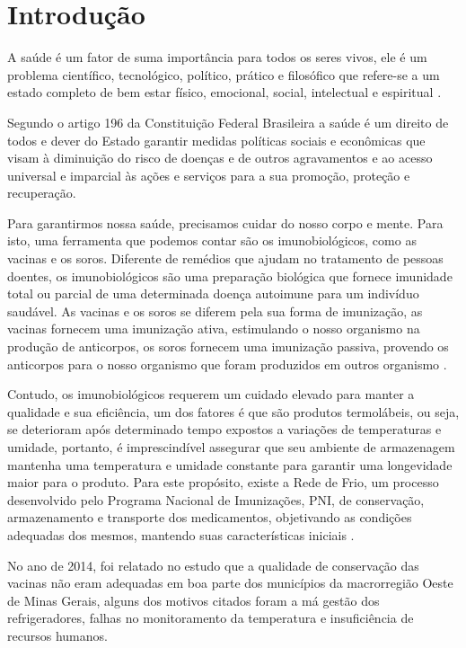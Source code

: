 \chapter[Introdução]{Introdução}
\label{cap:intro}
A saúde é um fator de suma importância para todos os seres vivos, ele é um problema científico, tecnológico, político, prático e filosófico que refere-se a um estado completo de bem estar físico, emocional, social, intelectual e espiritual \cite{almeida2011saude}. 

Segundo o artigo 196 \cite{de2013direito} da Constituição Federal Brasileira a saúde é um direito de todos e dever do Estado garantir medidas políticas sociais e econômicas que visam à diminuição do risco de doenças e de outros agravamentos e ao acesso universal e imparcial às ações e serviços para a sua promoção, proteção e recuperação.

Para garantirmos nossa saúde, precisamos cuidar do nosso corpo e mente. Para isto, uma ferramenta que podemos contar são os imunobiológicos, como as vacinas e os soros. Diferente de remédios que ajudam no tratamento de pessoas doentes, os imunobiológicos são uma preparação biológica que fornece imunidade total ou parcial de uma determinada doença autoimune para um indivíduo saudável. As vacinas e os soros se diferem pela sua forma de imunização, as vacinas fornecem uma imunização ativa, estimulando o nosso organismo na produção de anticorpos, os soros fornecem uma imunização passiva, provendo os anticorpos para o nosso organismo que foram produzidos  em outros organismo \cite{soma2018tratamento}.

Contudo, os imunobiológicos requerem um cuidado elevado para manter a qualidade e sua eficiência, um dos fatores é que são produtos termolábeis, ou seja, se deterioram após determinado tempo expostos a variações de temperaturas e umidade, portanto, é imprescindível assegurar que seu ambiente de armazenagem mantenha uma temperatura e umidade constante \cite{ministerio2001manual} para garantir uma longevidade maior para o produto. Para este propósito, existe a Rede de Frio, um processo desenvolvido pelo Programa Nacional de Imunizações, PNI, de conservação, armazenamento e transporte dos medicamentos, objetivando as condições adequadas dos mesmos, mantendo suas características iniciais \cite{ministerio2001manual}.

No ano de 2014, foi relatado no estudo \cite{oliveira2014avaliaccao} que a qualidade de conservação das vacinas não eram adequadas em boa parte dos municípios da macrorregião Oeste de Minas Gerais, alguns dos motivos citados foram a má gestão dos refrigeradores, falhas no monitoramento da temperatura e insuficiência de recursos humanos.

